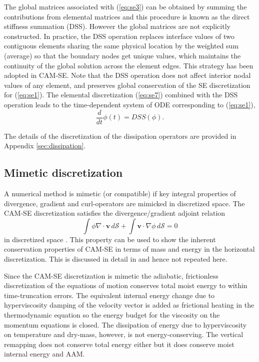 \documentclass{agujournal}
\begin{document}
{  The  global matrices associated with  (\ref{eq:se3}) can be obtained 
  by  summing the contributions from elemental matrices  and  this procedure is known as the 
  direct stiffness summation (DSS). However the global matrices are  not explicitly constructed. 
  In practice, the DSS operation replaces  interface values  of two  contiguous elements sharing the same physical location  
  by the  weighted sum (average)  so that  the boundary  nodes get unique values,   
   which maintains the continuity of the global solution across the element edges. This strategy has been adopted in CAM-SE. 
  Note that the DSS operation does not affect interior nodal values of any element, and  preserves global conservation of the SE discretization
  for (\ref{eq:se1}).  The elemental discretization (\ref{eq:se7}) combined with the  DSS operation  leads 
  to the time-dependent  system of ODE corresponding to (\ref{eq:se1}),
     \begin{equation}
  \frac{d }{dt} \phi(t) =   DSS(\phi).  \label{eq:se8}
       \end{equation}

The details of the discretization of the dissipation operators are provided in Appendix \ref{sec:dissipation}.
%
\subsection{Mimetic discretization}
A numerical method is mimetic (or compatible) if key integral properties of divergence, gradient and curl-operators are mimicked in discretized space. The CAM-SE discretization satisfies the divergence/gradient adjoint relation
\begin{equation}
\int \phi \nabla \cdot \mathbf{v} \, d\mathcal{S}+\int \mathbf{v} \cdot \nabla \phi \, d\mathcal{S}=0
\end{equation}
in  discretized space \citep{TF2010JCP}. This property can be used to show the inherent conservation properties of CAM-SE in terms of mass and energy in the horizontal discretization. This is discussed in detail in \cite{T2011LNCSEb} and hence not repeated here. 

Since the CAM-SE discretization is mimetic the adiabatic, frictionless discretization of the equations of motion conserves total moist energy to within time-truncation errors. The equivalent internal energy change due to hyperviscosity damping of the velocity vector is added as frictional heating in the thermodynamic equation so the energy budget for the viscosity on the momentum equations is closed. The dissipation of energy due to hyperviscosity on temperature and dry-mass, however, is not energy-conserving. The vertical remapping does not conserve total energy either but it does conserve moist internal energy and AAM.


}
\end{document}
